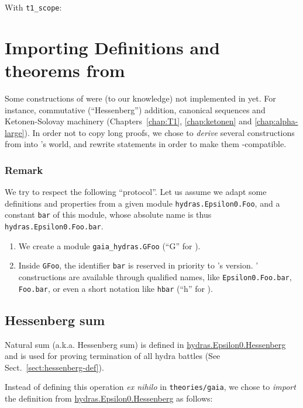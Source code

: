 With \texttt{t1\_scope}:

\section{Importing Definitions and theorems from \HydrasLib}

Some constructions of \HydrasLib were (to our knowledge) not implemented in \gaia yet. For instance, commutative (``Hessenberg'') addition, canonical sequences and Ketonen-Solovay machinery (Chapters~\ref{chap:T1}, \ref{chap:ketonen} and \ref{chap:alpha-large}). In order not to copy long proofs, we chose to
\emph{derive} several constructions from \HydrasLib into \gaia's world, and rewrite \HydrasLib statements in order to make them \gaia-compatible.


\subsubsection{Remark}
\label{sect:gaia-masking}
We try to respect the following ``protocol''.
Let us assume we adapt some definitions and properties
from a given module \texttt{hydras.Epsilon0.Foo}, and a constant \texttt{bar} of this module, whose absolute name is
thus \texttt{hydras.Epsilon0.Foo.bar}.
\begin{enumerate}
\item We create a module \texttt{gaia\_hydras.GFoo}
  (``G'' for \gaia).
\item Inside \texttt{GFoo}, the identifier \texttt{bar}
  is reserved in priority to \gaia's version.
\HydrasLib' constructions are available through qualified names, like \texttt{Epsilon0.Foo.bar}, \texttt{Foo.bar}, or even a short notation like \texttt{hbar}  (``h'' for \HydrasLib).
\end{enumerate}

\subsection{Hessenberg sum}
Natural sum  (a.k.a. Hessenberg  sum) is defined in
\href{../theories/html/hydras.Epsilon0.Hessenberg.html}{hydras.Epsilon0.Hessenberg} and is used for proving termination of all hydra battles (See Sect.~\ref{sect:hessenberg-def}).

Instead of defining this operation \emph{ex nihilo} in \texttt{theories/gaia}, we chose to \emph{import} the definition
from \href{../theories/html/hydras.Epsilon0.Hessenberg.html}{hydras.Epsilon0.Hessenberg} as follows:

